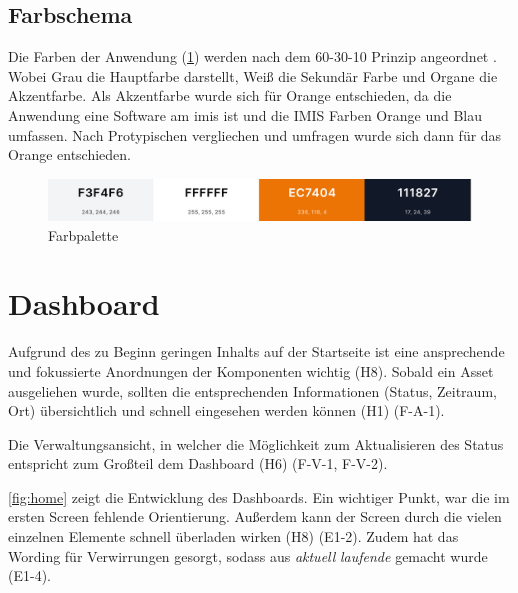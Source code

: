 \subsection{Farbschema}
Die Farben der Anwendung (\ref{fig:farben}) werden nach dem 60-30-10 Prinzip angeordnet
\cite{experience_using}. Wobei Grau die Hauptfarbe darstellt, Weiß die Sekundär Farbe und Organe die
Akzentfarbe. Als Akzentfarbe wurde sich für Orange entschieden, da die Anwendung eine Software am
\ac{imis} ist und die IMIS Farben Orange und Blau umfassen. Nach Protypischen vergliechen und
umfragen wurde sich dann für das Orange entschieden.
\begin{figure}[h]
    \centering
    \includegraphics[scale=0.23]{Bilder/farben.png}
    \caption[Farbpalette]{Farbpalette}
    \label{fig:farben}
\end{figure}

\section{Dashboard}
Aufgrund des zu Beginn geringen Inhalts auf der Startseite ist eine ansprechende und fokussierte
Anordnungen der Komponenten wichtig (H8). Sobald ein Asset ausgeliehen wurde, sollten die
entsprechenden Informationen (Status, Zeitraum, Ort) übersichtlich und schnell eingesehen werden
können (H1) (F-A-1).

Die Verwaltungsansicht, in welcher die Möglichkeit zum Aktualisieren des Status entspricht zum
Großteil dem Dashboard (H6) (F-V-1, F-V-2).

\ref{fig:home} zeigt die Entwicklung des Dashboards. Ein wichtiger Punkt, war die im ersten Screen
fehlende Orientierung. Außerdem kann der Screen durch die vielen einzelnen Elemente schnell
überladen wirken (H8) (E1-2). Zudem hat das Wording für Verwirrungen gesorgt, sodass aus \textit{aktuell}
\textit{laufende} gemacht wurde (E1-4). 


